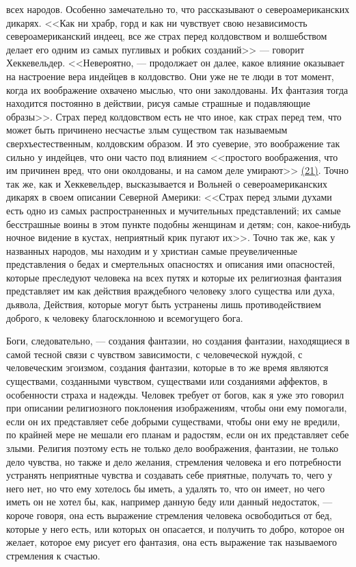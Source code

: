 \documentclass[12pt]{article}
\begin{document}
всех народов. Особенно замечательно то, что рассказывают о североамериканских дикарях. <<Как ни храбр, горд и как ни чувствует свою независимость североамериканский индеец, все же страх перед колдовством и волшебством делает его одним из самых пугливых и робких созданий>>  --- говорит Хеккевельдер. <<Невероятно, --- продолжает он далее, какое влияние оказывает на настроение вера индейцев в колдовство. Они уже не те люди в тот момент, когда их воображение охвачено мыслью, что они заколдованы. Их фантазия тогда находится постоянно в действии, рисуя самые страшные и подавляющие образы>>. Страх перед колдовством есть не что иное, как страх перед тем, что может быть причинено несчастье злым существом так называемым сверхъестественным, колдовским образом. И это суеверие, это воображение так сильно у индейцев, что они часто под влиянием <<простого воображения, что им причинен вред, что они околдованы, и на самом деле умирают>> \hyperlink{21}{(21)}\hypertarget{b21}{}. Точно так же, как и Хеккевельдер, высказывается и Вольней о североамериканских дикарях в своем описании Северной Америки: <<Страх перед злыми духами есть одно из самых распространенных и мучительных представлений; их самые бесстрашные воины в этом пункте подобны женщинам и детям; сон, какое-нибудь ночное видение в кустах, неприятный крик пугают их>>. Точно так же, как у названных народов, мы находим и у христиан самые преувеличенные представления о бедах и смертельных опасностях и описания ими опасностей, которые преследуют человека на всех путях и которые их религиозная фантазия представляет им как действия враждебного человеку злого существа или духа, дьявола, Действия, которые могут быть устранены лишь противодействием доброго, к человеку благосклонною и всемогущего бога. 

Боги, следовательно, --- создания фантазии, но создания фантазии, находящиеся в самой тесной связи с чувством зависимости, с человеческой нуждой, с человеческим эгоизмом, создания фантазии, которые в то же время являются существами, созданными чувством, существами или созданиями аффектов, в особенности страха и надежды. Человек требует от богов, как я уже это говорил при описании религиозного поклонения изображениям, чтобы они ему помогали, если он их представляет себе добрыми существами, чтобы они ему не вредили, по крайней мере не мешали его планам и радостям, если он их представляет себе злыми. Религия поэтому есть не только дело воображения, фантазии, не только дело чувства, но также и дело желания, стремления человека и его потребности устранять неприятные чувства и создавать себе приятные, получать то, чего у него нет, но что ему хотелось бы иметь, а удалять то, что он имеет, но чего иметь он не хотел бы, как, например данную беду или данный недостаток, --- короче говоря, она есть выражение стремления человека освободиться от бед, которые у него есть, или которых он опасается, и получить то добро, которое он желает, которое ему рисует его фантазия, она есть выражение так называемого стремления к счастью. 
\end{document}
